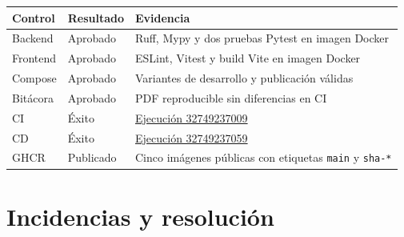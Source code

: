 \documentclass[11pt,letterpaper]{article}
\newcommand{\file}[1]{\texttt{#1}}
\begin{document}
\begin{tabularx}{\textwidth}{@{}X l X@{}}
  \toprule
  Control & Resultado & Evidencia \\
  \midrule
  Backend & Aprobado & Ruff, Mypy y dos pruebas Pytest en imagen Docker \\
  Frontend & Aprobado & ESLint, Vitest y build Vite en imagen Docker \\
  Compose & Aprobado & Variantes de desarrollo y publicación válidas \\
  Bitácora & Aprobado & PDF reproducible sin diferencias en CI \\
  CI & Éxito & \href{https://github.com/LFXAS/prototipo-bi-ia/actions/runs/32749237009}{Ejecución 32749237009} \\
  CD & Éxito & \href{https://github.com/LFXAS/prototipo-bi-ia/actions/runs/32749237059}{Ejecución 32749237059} \\
  GHCR & Publicado & Cinco imágenes públicas con etiquetas \file{main} y \file{sha-*} \\
  \bottomrule
\end{tabularx}

\section{Incidencias y resolución}
\end{document}
